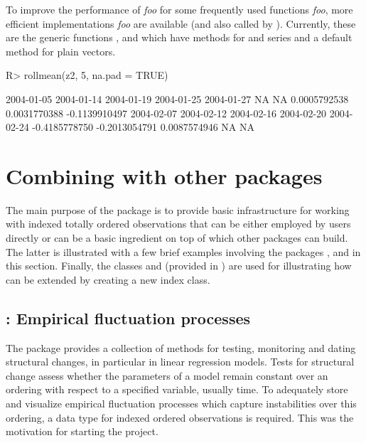 \documentclass{Z}
\begin{document}
To improve the performance of \textit{foo}\code{)} for some frequently
used functions \textit{foo}, more efficient implementations \textit{foo}
are available (and also called by ). 
Currently, these are the generic functions , 
and  which have methods for  and  series and a 
default method for plain vectors.

\begin{Schunk}
\begin{Sinput}
R> rollmean(z2, 5, na.pad = TRUE)
\end{Sinput}
\begin{Soutput}
   2004-01-05    2004-01-14    2004-01-19    2004-01-25    2004-01-27 
           NA            NA  0.0005792538  0.0031770388 -0.1139910497 
   2004-02-07    2004-02-12    2004-02-16    2004-02-20    2004-02-24 
-0.4185778750 -0.2013054791  0.0087574946            NA            NA 
\end{Soutput}
\end{Schunk}


\section[Combining zoo with other packages]{Combining  with other packages}
\label{sec:combining}

The main purpose of the package  is to provide basic infrastructure for
working with indexed totally ordered observations that can be either employed by
users directly or can be a basic ingredient on top of which other packages can
build. The latter is illustrated with a few brief examples involving the packages
,  and  in this section. Finally, the 
classes  and  (provided in )
are used for illustrating how  can be extended by creating a new index class.

\subsection[strucchange: Empirical fluctuation processes]{: Empirical fluctuation processes}
\label{sec:strucchange}

The package  provides a collection of methods for testing,
monitoring and dating structural changes, in particular in linear regression models.
Tests for structural change assess whether the parameters of a model remain
constant over an ordering with respect to a specified variable, usually time.
To adequately store and visualize empirical fluctuation processes which 
capture instabilities over this ordering, a data type for indexed ordered
observations is required. This was the motivation for starting the 
project.
\end{document}
